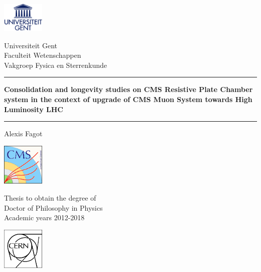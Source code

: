 \documentclass[10pt,a4paper,twoside,dutch,english,openright,leqno]{book}                %
\begin{document}
\latintext
\graphicspath{{fig/}}

% 
 \thispagestyle{empty}   %
% 
 \noindent
 \begin{minipage}{3cm}%
   \includegraphics*[width=2cm]{UGentlogo}%
 \end{minipage}\hfill
 \begin{minipage}{8cm}
 \raggedleft
 \textsf{Universiteit Gent\\
 Faculteit Wetenschappen\\
 Vakgroep Fysica en Sterrenkunde}
 \end{minipage}
\vspace{2cm}
% 
\bigskip
 \hrule
 \vspace{5mm}
   \begin{centering}
     \LARGE \textbf{\textsf{Consolidation and longevity studies on CMS Resistive Plate Chamber system in the context of upgrade of CMS Muon System towards High Luminosity LHC}}\\
   \end{centering}
 \vspace{5mm}
 \hrule
% 
\vfill
 \bigskip
 \begin{centering}
   \LARGE\noindent\textsf{Alexis Fagot}
 \end{centering}
 \bigskip
 \normalsize
% 
 \vfill
 \begin{minipage}{2.0cm}%
     \includegraphics*[width=2.0cm]{CMS}%
 \end{minipage}\hfill
 \begin{minipage}{6cm}
 \centering
 \textsf{Thesis to obtain the degree of\\
 Doctor of Philosophy in Physics\\
 Academic years 2012-2018}
 \end{minipage}\hfill
 \begin{minipage}{2.0cm}%
     \includegraphics*[width=2.0cm]{CERN}%
 \end{minipage}\hfill
\end{document}

